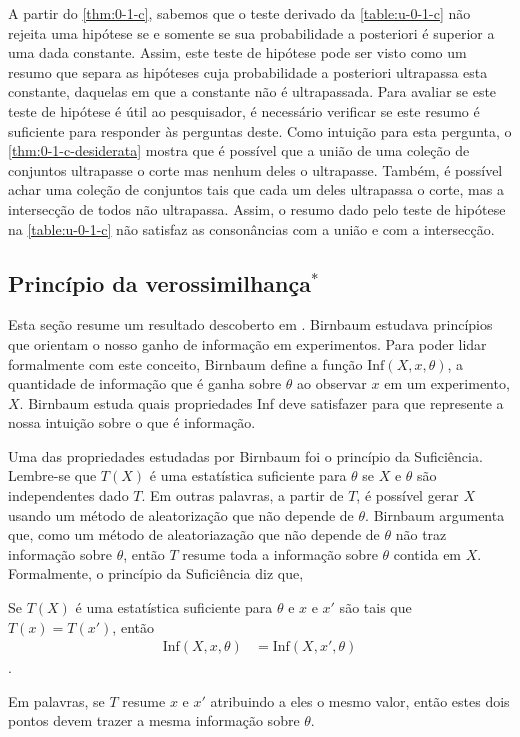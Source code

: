 A partir do \cref{thm:0-1-c},
sabemos que o teste derivado da 
\cref{table:u-0-1-c} não rejeita uma 
hipótese se e somente se
sua probabilidade a posteriori é superior a 
uma dada constante.
Assim, este teste de hipótese pode ser
visto como um resumo que 
separa as hipóteses cuja probabilidade 
a posteriori ultrapassa esta constante,
daquelas em que a constante não é ultrapassada.
Para avaliar se este teste de hipótese é
útil ao pesquisador, é 
necessário verificar se este resumo é 
suficiente para responder às perguntas deste.
Como intuição para esta pergunta,
o \cref{thm:0-1-c-desiderata} mostra
que é possível que a união de uma 
coleção de conjuntos ultrapasse o corte mas 
nenhum deles o ultrapasse.
Também, é possível achar uma coleção de conjuntos
tais que cada um deles ultrapassa o corte, mas 
a intersecção de todos não ultrapassa.
Assim, o resumo dado pelo teste de hipótese na
\cref{table:u-0-1-c} não satisfaz as 
consonâncias com a união e com a intersecção.

\subsection{Princípio da verossimilhança$^*$}
Esta seção resume um resultado 
descoberto em \citet{Birnbaum1962}.
Birnbaum estudava princípios que orientam o 
nosso ganho de informação em experimentos.
Para poder lidar formalmente com este conceito,
Birnbaum define a função $\text{Inf}(X,x,\theta)$,
a quantidade de informação que é ganha sobre $\theta$
ao observar $x$ em um experimento, $X$.
Birnbaum estuda quais propriedades Inf deve 
satisfazer para que represente a 
nossa intuição sobre o que é informação.

Uma das propriedades estudadas por Birnbaum foi
o princípio da Suficiência.
Lembre-se que $T(X)$ é uma estatística suficiente 
para $\theta$ se $X$ e $\theta$ são 
independentes dado $T$.
Em outras palavras, a partir de $T$, 
é possível gerar $X$ usando um método de 
aleatorização que não depende de $\theta$.
Birnbaum argumenta que, como 
um método de aleatoriazação que
não depende de $\theta$ não 
traz informação sobre $\theta$, então 
$T$ resume toda a informação sobre $\theta$ 
contida em $X$.
Formalmente, o princípio da Suficiência diz que,
\begin{definition}
 Se $T(X)$ é uma estatística suficiente para 
 $\theta$ e $x$ e $x'$ são tais que 
 $T(x) = T(x')$, então
 \begin{align*}
  \text{Inf}(X,x,\theta) &= \text{Inf}(X,x',\theta)
 \end{align*}.
\end{definition}
Em palavras, se $T$ resume $x$ e $x'$ 
atribuindo a eles o mesmo valor, então 
estes dois pontos devem trazer 
a mesma informação sobre $\theta$.

